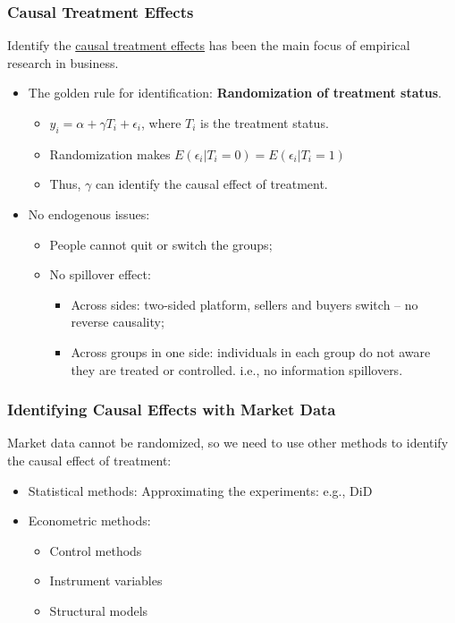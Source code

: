 \documentclass[10pt]{beamer}
\begin{document}
\begin{frame}
\frametitle{Causal Treatment Effects}
Identify the \underline{causal treatment effects} has been the main focus of empirical research in business.
\begin{itemize}
    \item The golden rule for identification: \textbf{Randomization of treatment status}.
    \begin{itemize}
        \item $y_i = \alpha + \gamma T_i + \epsilon_i$, where $T_i$ is the treatment status.
        \item Randomization makes $E(\epsilon_i | T_i = 0) = E(\epsilon_i | T_i = 1)$
        \item Thus, $\gamma$ can identify the causal effect of treatment.
    \end{itemize}
    \item No endogenous issues: 
    \begin{itemize}
        \item People cannot quit or switch the groups;
        \item No spillover effect:
        \begin{itemize}
            \item Across sides: two-sided platform, sellers and buyers switch -- no reverse causality;
            \item Across groups in one side: individuals in each group do not aware they are treated or controlled. i.e., no information spillovers.
        \end{itemize}
    \end{itemize}
\end{itemize}
\end{frame}

\begin{frame}
\frametitle{Identifying Causal Effects with Market Data}
Market data cannot be randomized, so we need to use other methods to identify the causal effect of treatment:
\begin{itemize}
    \item Statistical methods: Approximating the experiments: e.g., DiD
    \item Econometric methods:
    \begin{itemize}
        \item Control methods
        \item Instrument variables
        \item Structural models
    \end{itemize}
\end{itemize}
\end{frame}
\end{document}
